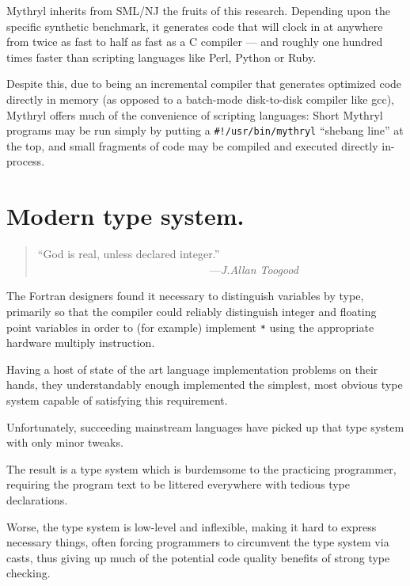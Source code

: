 Mythryl inherits from {\sc SML/NJ} the fruits of this research.  Depending upon the specific 
synthetic benchmark, it generates code that will clock in at anywhere from twice as fast to half as fast as 
a C compiler --- and roughly one hundred times faster than scripting languages like 
Perl, Python or Ruby.

Despite this, due to being an incremental compiler that generates optimized code 
directly in memory (as opposed to a batch-mode disk-to-disk compiler like gcc), 
Mythryl offers much of the convenience of scripting languages:  Short Mythryl 
programs may be run simply by putting a {\tt #!/usr/bin/mythryl} ``shebang line'' 
at the top, and small fragments of code may be compiled and executed directly 
in-process.



\section{Modern type system.}

\begin{quote}\begin{tiny}
                    ``God is real, unless declared integer.''\newline
                    ~~~~~~~~~~~~~~~~~~~~~~~~~~~~~~~---{\em J.Allan Toogood}
\end{tiny}\end{quote}


The Fortran designers found it necessary to distinguish variables by 
type, primarily so that the compiler could reliably distinguish 
integer and floating point variables in order to (for example) 
implement \verb|*| using the appropriate hardware multiply instruction. 

Having a host of state of the art language implementation problems 
on their hands, they understandably enough implemented the simplest, 
most obvious type system capable of satisfying this requirement.

Unfortunately, succeeding mainstream languages have picked up that 
type system with only minor tweaks.

The result is a type system 
which is burdemsome to the practicing programmer, 
requiring the program text to be littered everywhere with tedious 
type declarations.

Worse, the type system is low-level and inflexible, making it hard to 
express necessary things, often forcing programmers to circumvent the 
type system via casts, thus giving up much of the potential code 
quality benefits of strong type checking.

